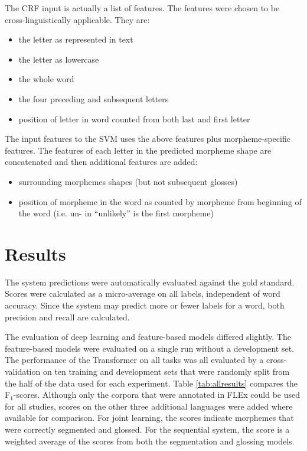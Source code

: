 The CRF input is actually a list of features. The features were chosen to be cross-linguistically applicable. They are:

\begin{itemize}
    \item the letter as represented in text
    \item the letter as lowercase
    \item the whole word
    \item the four preceding and subsequent letters
    \item position of letter in word counted from both last and first letter
\end{itemize}

The input features to the SVM uses the above features plus morpheme-specific features. The features of each letter in the predicted morpheme shape are concatenated and then additional features are added:

\begin{itemize}
    \item surrounding morphemes shapes (but not subsequent glosses)
    \item position of morpheme in the word as counted by morpheme from beginning of the word (i.e. un- in ``unlikely'' is the first morpheme)
    
\end{itemize}


\section{Results}
\label{sec:results}

The system predictions were automatically evaluated against the gold standard. Scores were calculated as a micro-average on all labels, independent of word accuracy. Since the system may predict more or fewer labels for a word, both precision and recall are calculated. 

The evaluation of deep learning and feature-based models differed slightly. The feature-based models were evaluated on a single run without a development set. The performance of the Transformer on all tasks was all evaluated by a cross-validation on ten training and development sets that were randomly split from the half of the data used for each experiment. Table \ref{tab:allresults} compares the F$_1$-scores. Although only the corpora that were annotated in FLEx could be used for all studies, scores on the other three additional languages were added where available for comparison.
For joint learning, the scores indicate morphemes that were correctly segmented and glossed. For the sequential system, the score is a weighted average of the scores from both the segmentation and glossing models. 

